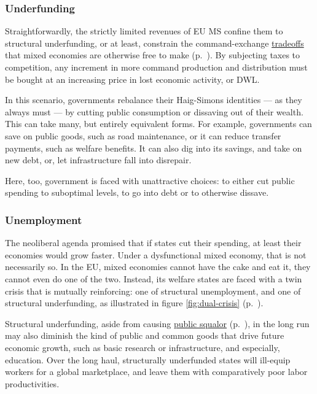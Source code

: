 \documentclass[11pt,a4paper,oneside]{article}
\begin{document}
\subsubsection{Underfunding} \label{sec:public-squalor} 
Straightforwardly, the strictly limited revenues of \gls{EU} \gls{MS} confine them to structural underfunding, or at least, constrain the command-exchange \hyperref[sec:tradeoffs]{tradeoffs} that mixed economies are otherwise free to make (p.~\pageref{sec:tradeoffs}). %
By subjecting taxes to competition, any increment in more command production and distribution must be bought at an increasing price in lost economic activity, or \gls{DWL}. 

In this scenario, governments rebalance their Haig-Simons identities --- as they always must --- by cutting public consumption or dissaving out of their wealth. 
This can take many, but entirely equivalent forms. 
For example, governments can save on public goods, such as road maintenance, or it can reduce transfer payments, such as welfare benefits. 
It can also dig into its savings, and take on new debt, or, let infrastructure fall into disrepair.

Here, too, government is faced with unattractive choices: 
to either cut public spending to suboptimal levels, to go into debt or to otherwise dissave.


\subsubsection{Unemployment}
The neoliberal agenda promised that if states cut their spending, at least their economies would grow faster. 
Under a dysfunctional mixed economy, that is not necessarily so. 
In the \gls{EU}, mixed economies cannot have the cake and eat it, they cannot even do one of the two. 
Instead, its welfare states are faced with a twin crisis that is mutually reinforcing: 
one of structural unemployment, and one of structural underfunding, as illustrated in figure \ref{fig:dual-crisis} (p.~\pageref{fig:dual-crisis}). 

Structural underfunding, aside from causing \hyperref[sec:public-squalor]{public squalor} (p.~\pageref{sec:public-squalor}), in the long run may also diminish the kind of public and common goods that drive future economic growth, such as basic research or infrastructure, and especially, education. 
Over the long haul, structurally underfunded states will ill-equip workers for a global marketplace, and leave them with comparatively poor labor productivities.
\end{document}

